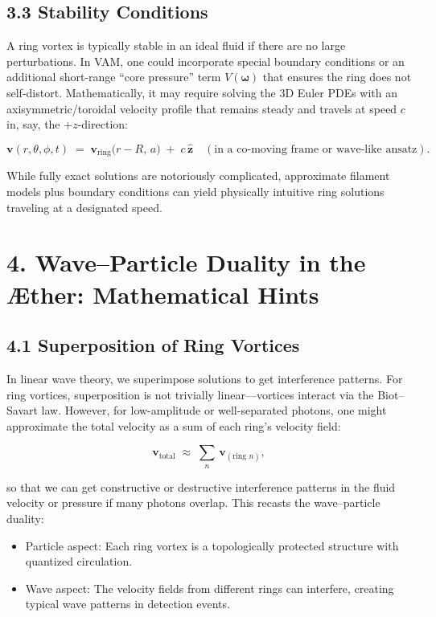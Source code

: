 \subsection*{3.3 Stability Conditions}
A ring vortex is typically stable in an ideal fluid if there are no large perturbations. In VAM, one could incorporate special boundary conditions or an additional short-range “core pressure” term \(V(\boldsymbol{\omega})\) that ensures the ring does not self-distort. Mathematically, it may require solving the 3D Euler PDEs with an axisymmetric/toroidal velocity profile that remains steady and travels at speed \(c\) in, say, the \(+z\)-direction:

\[
 \mathbf{v}(r,\theta,\phi, t) \;=\; \mathbf{v}_{\text{ring}}\bigl(r - R,\,a\bigr) \;+\; c\,\hat{\mathbf{z}} \quad (\text{in a co-moving frame or wave-like ansatz}).
\]

While fully exact solutions are notoriously complicated, approximate filament models plus boundary conditions can yield physically intuitive ring solutions traveling at a designated speed.

\section*{4. Wave–Particle Duality in the Æther: Mathematical Hints}
\subsection*{4.1 Superposition of Ring Vortices}
In linear wave theory, we superimpose solutions to get interference patterns. For ring vortices, superposition is not trivially linear—vortices interact via the Biot–Savart law. However, for low-amplitude or well-separated photons, one might approximate the total velocity as a sum of each ring’s velocity field:

\[
 \mathbf{v}_{\text{total}} \;\approx\; \sum_{n}\,\mathbf{v}_{(\text{ring } n)},
\]

so that we can get constructive or destructive interference patterns in the fluid velocity or pressure if many photons overlap. This recasts the wave–particle duality:

\begin{itemize}
 \item Particle aspect: Each ring vortex is a topologically protected structure with quantized circulation.
 \item Wave aspect: The velocity fields from different rings can interfere, creating typical wave patterns in detection events.
\end{itemize}

